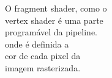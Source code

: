 \documentclass[preview]{standalone}
\begin{document}
O fragment shader, como o\\vertex shader é uma parte\\programável da pipeline.\\onde é definida a\\cor de cada pixel da\\imagem rasterizada.\\
\end{document}
